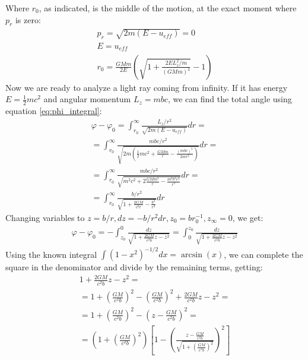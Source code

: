 \documentclass{article}
\begin{document}
Where $r_0$, as indicated, is the middle of the motion, at the exact moment where $p_r$ is zero:
\begin{equation}
\begin{gathered}
\label{eq:r_0}
    p_r = \sqrt{2m(E - u_{eff})} = 0
    \\
    E = u_{eff}
    \\
    r_0 = \frac{GMm}{2E}\left(\sqrt{1 + \frac{2E L_z^2/m}{\left(GMm\right)^2}}-1\right)
\end{gathered}
\end{equation}
Now we are ready to analyze a light ray coming from infinity. If it has energy $E = \frac{1}{2}mc^2$ and angular momentum $L_z = mbc$, we can find the total angle using equation \ref{eq:phi_integral}:
\begin{equation}
\begin{gathered}
    \varphi - \varphi_0 = \int_{r_0}^\infty \frac{L_z / r^2}{\sqrt{2m(E - u_{eff})}} dr = 
    \\
    = \int_{r_0}^\infty \frac{mbc / r^2}{\sqrt{2m(\frac{1}{2}mc^2 + \frac{GMm}{r} - \frac{(mbc)^2}{2mr^2})}} dr = 
    \\
    = \int_{r_0}^\infty \frac{mbc / r^2}{\sqrt{m^2c^2 + 2\frac{GMm^2}{r} - \frac{m^2b^2c^2}{r^2}}} dr = 
    \\
    = \int_{r_0}^\infty \frac{b / r^2}{\sqrt{1 + \frac{2GM}{c^2r} - \frac{b^2}{r^2}}} dr
\end{gathered}
\end{equation}
Changing variables to $z = b/r, dz = -b/r^2dr, z_0 = br_0^{-1}, z_\infty = 0$, we get:
\begin{equation}
\begin{gathered}
    \varphi - \varphi_0 = -\int_{z_0}^0 \frac{dz}{\sqrt{1 + \frac{2GM}{c^2b}z - z^2}}
    = \int_0^{z_0} \frac{dz}{\sqrt{1 + \frac{2GM}{c^2b}z - z^2}}
\end{gathered}
\end{equation}
Using the known integral $\int(1-x^2)^{-1/2}dx = \arcsin(x)$, we can complete the square in the denominator and divide by the remaining terms, getting:
\begin{equation}
\begin{gathered}
    1 + \frac{2GM}{c^2b}z - z^2 = 
    \\
    = 1 + \left(\frac{GM}{c^2b}\right)^2 - \left(\frac{GM}{c^2b}\right)^2 + \frac{2GM}{c^2b}z - z^2 = 
    \\
    = 1 + \left(\frac{GM}{c^2b}\right)^2 - \left(z - \frac{GM}{c^2b}\right)^2 = 
    \\
    = \left(1 + \left(\frac{GM}{c^2b}\right)^2\right)\left[1 - \left(\frac{z - \frac{GM}{c^2b}}{\sqrt{1 + \left(\frac{GM}{c^2b}\right)^2}}\right)^2\right]
\end{gathered}
\end{equation}
\end{document}
